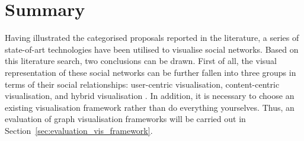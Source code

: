 \section{Summary}
Having illustrated the categorised proposals reported in the literature, a series of state-of-art technologies have been utilised to visualise social networks. Based on this literature search, two conclusions can be drawn. First of all, the visual representation of these social networks can be further fallen into three groups in terms of their social relationships: user-centric visualisation, content-centric visualisation, and hybrid visualisation \citep{Chen2010}. In addition, it is necessary to choose an existing visualisation framework rather than do everything yourselves. Thus, an evaluation of graph visualisation frameworks will be carried out in Section~\ref{sec:evaluation_vis_framework}.
